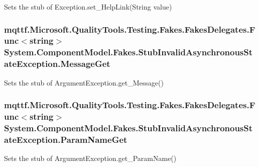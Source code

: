 Sets the stub of Exception.\-set\-\_\-\-Help\-Link(\-String value)

\hypertarget{class_system_1_1_component_model_1_1_fakes_1_1_stub_invalid_asynchronous_state_exception_a3c464dd0cf5fe70fd1eac99217c85cb8}{
\subsubsection[{Message\-Get}]{\setlength{\rightskip}{0pt plus 5cm}mqttf.\-Microsoft.\-Quality\-Tools.\-Testing.\-Fakes.\-Fakes\-Delegates.\-Func$<$string$>$ System.\-Component\-Model.\-Fakes.\-Stub\-Invalid\-Asynchronous\-State\-Exception.\-Message\-Get}}\label{class_system_1_1_component_model_1_1_fakes_1_1_stub_invalid_asynchronous_state_exception_a3c464dd0cf5fe70fd1eac99217c85cb8}


Sets the stub of Argument\-Exception.\-get\-\_\-\-Message()

\hypertarget{class_system_1_1_component_model_1_1_fakes_1_1_stub_invalid_asynchronous_state_exception_aa8b687241dae71933b1f6d35970f2937}{
\subsubsection[{Param\-Name\-Get}]{\setlength{\rightskip}{0pt plus 5cm}mqttf.\-Microsoft.\-Quality\-Tools.\-Testing.\-Fakes.\-Fakes\-Delegates.\-Func$<$string$>$ System.\-Component\-Model.\-Fakes.\-Stub\-Invalid\-Asynchronous\-State\-Exception.\-Param\-Name\-Get}}\label{class_system_1_1_component_model_1_1_fakes_1_1_stub_invalid_asynchronous_state_exception_aa8b687241dae71933b1f6d35970f2937}


Sets the stub of Argument\-Exception.\-get\-\_\-\-Param\-Name()

